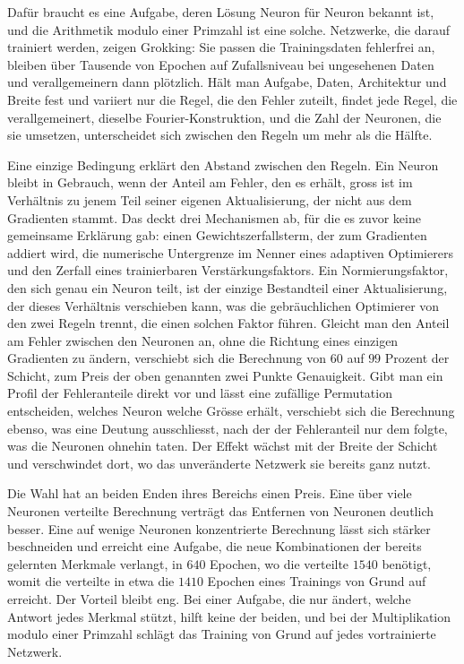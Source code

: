 Dafür braucht es eine Aufgabe, deren Lösung Neuron für Neuron bekannt ist, und
die Arithmetik modulo einer Primzahl ist eine solche. Netzwerke, die darauf
trainiert werden, zeigen Grokking: Sie passen die Trainingsdaten fehlerfrei an,
bleiben über Tausende von Epochen auf Zufallsniveau bei ungesehenen Daten und
verallgemeinern dann plötzlich. Hält man Aufgabe, Daten, Architektur und Breite
fest und variiert nur die Regel, die den Fehler zuteilt, findet jede Regel, die
verallgemeinert, dieselbe Fourier-Konstruktion, und die Zahl der Neuronen, die
sie umsetzen, unterscheidet sich zwischen den Regeln um mehr als die Hälfte.

Eine einzige Bedingung erklärt den Abstand zwischen den Regeln. Ein Neuron
bleibt in Gebrauch, wenn der Anteil am
Fehler, den es erhält, gross ist im Verhältnis zu jenem Teil seiner eigenen
Aktualisierung, der nicht aus dem Gradienten stammt. Das deckt drei
Mechanismen ab, für die es zuvor keine gemeinsame Erklärung gab: einen
Gewichtszerfallsterm, der zum Gradienten addiert wird, die numerische
Untergrenze im Nenner eines adaptiven Optimierers und den Zerfall eines
trainierbaren Verstärkungsfaktors. Ein Normierungsfaktor, den sich genau ein
Neuron teilt, ist der einzige Bestandteil einer Aktualisierung, der dieses
Verhältnis verschieben kann, was die gebräuchlichen Optimierer von den zwei
Regeln trennt, die einen solchen Faktor führen. Gleicht man den Anteil am
Fehler zwischen den Neuronen an, ohne die
Richtung eines einzigen Gradienten zu ändern, verschiebt sich die Berechnung
von $60$ auf $99$ Prozent der Schicht, zum Preis der oben genannten zwei
Punkte Genauigkeit. Gibt man ein Profil der Fehleranteile direkt vor und lässt
eine zufällige Permutation entscheiden, welches Neuron welche Grösse erhält,
verschiebt sich die Berechnung ebenso, was eine Deutung ausschliesst, nach
der der Fehleranteil nur dem folgte, was die Neuronen ohnehin taten. Der
Effekt wächst
mit der Breite der Schicht und verschwindet dort, wo das unveränderte Netzwerk
sie bereits ganz nutzt.

Die Wahl hat an beiden Enden ihres Bereichs einen Preis. Eine über viele Neuronen verteilte
Berechnung verträgt das Entfernen von Neuronen deutlich besser. Eine auf wenige
Neuronen konzentrierte Berechnung lässt sich stärker beschneiden und erreicht
eine Aufgabe, die neue Kombinationen der bereits gelernten Merkmale verlangt,
in $640$ Epochen, wo die verteilte $1540$ benötigt, womit die verteilte in
etwa die $1410$ Epochen eines Trainings von Grund auf erreicht. Der Vorteil
bleibt eng. Bei einer Aufgabe, die nur ändert, welche Antwort jedes Merkmal
stützt, hilft keine der beiden, und bei der Multiplikation modulo einer
Primzahl schlägt das Training von Grund auf jedes vortrainierte Netzwerk.

